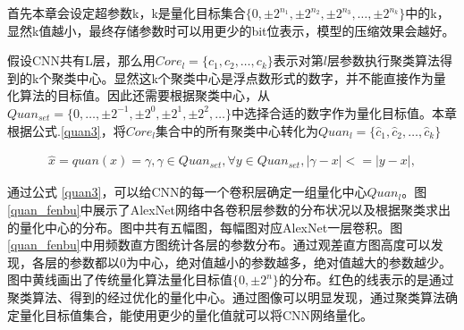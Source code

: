 \documentclass[ pdftex, oneside, master]{NJUthesis}
\begin{document}
首先本章会设定超参数k，k是量化目标集合$\{0,\pm2^{n_1},\pm2^{n_2}, \pm2^{n_3}, \dots,\pm2^{n_k}\}$中的k，显然k值越小，最终存储参数时可以用更少的bit位表示，模型的压缩效果会越好。

假设CNN共有L层，那么用$Core_l=\{c_1, c_2, \dots, c_k\}$表示对第$l$层参数执行聚类算法得到的k个聚类中心。显然这k个聚类中心是浮点数形式的数字，并不能直接作为量化算法的目标值。因此还需要根据聚类中心，从$Quan_{set} = \{0,  \dots, \pm2^{-1}, \pm2^{0}, \pm2^{1}, \pm2^{2}, \dots \}$中选择合适的数字作为量化目标值。本章根据公式.\ref{quan3}，将$Core_l$集合中的所有聚类中心转化为$Quan_l=\{\hat c_1, \hat c_2, \dots, \hat  c_k\}$

\begin{eqnarray}
\hat x = quan(x) = \gamma,
\gamma \in Quan_{set},
\forall y \in Quan_{set}, |\gamma - x|<= |y - x|,
\label{quan3}
\end{eqnarray}

通过公式 \ref{quan3}，可以给CNN的每一个卷积层确定一组量化中心$Quan_l$。图 \ref{quan_fenbu}中展示了AlexNet网络中各卷积层参数的分布状况以及根据聚类求出的量化中心的分布。图中共有五幅图，每幅图对应AlexNet一层卷积。图 \ref{quan_fenbu}中用频数直方图统计各层的参数分布。通过观差直方图高度可以发现，各层的参数都以0为中心，绝对值越小的参数越多，绝对值越大的参数越少。图中黄线画出了传统量化算法量化目标值$\{0, \pm 2^n\}$的分布。红色的线表示的是通过聚类算法、得到的经过优化的量化中心。通过图像可以明显发现，通过聚类算法确定量化目标值集合，能使用更少的量化值就可以将CNN网络量化。
\end{document}
